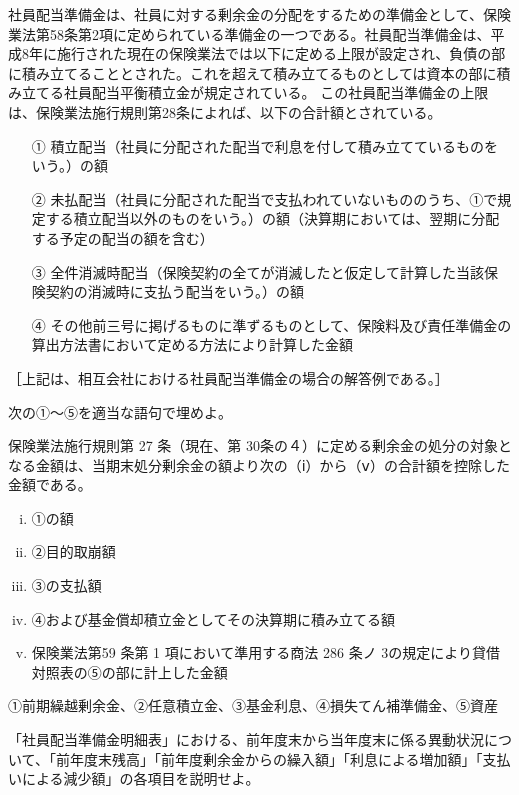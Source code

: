 \documentclass[report,gutter=10mm,fore-edge=10mm,uplatex,dvipdfmx]{jlreq}
\begin{document}

社員配当準備金は、社員に対する剰余金の分配をするための準備金として、保険業法第58条第2項に定められている準備金の一つである。社員配当準備金は、平成8年に施行された現在の保険業法では以下に定める上限が設定され、負債の部に積み立てることとされた。これを超えて積み立てるものとしては資本の部に積み立てる社員配当平衡積立金が規定されている。
この社員配当準備金の上限は、保険業法施行規則第28条によれば、以下の合計額とされている。
\begin{enumerate}
\item [①] 積立配当（社員に分配された配当で利息を付して積み立てているものをいう。）の額
\item [②] 未払配当（社員に分配された配当で支払われていないもののうち、①で規定する積立配当以外のものをいう。）の額（決算期においては、翌期に分配する予定の配当の額を含む）
\item [③] 全件消滅時配当（保険契約の全てが消滅したと仮定して計算した当該保険契約の消滅時に支払う配当をいう。）の額
\item [④] その他前三号に掲げるものに準ずるものとして、保険料及び責任準備金の算出方法書において定める方法により計算した金額
\end{enumerate}

［上記は、相互会社における社員配当準備金の場合の解答例である。］


次の①～⑤を適当な語句で埋めよ。 

保険業法施行規則第 27 条（現在、第 30条の４）に定める剰余金の処分の対象となる金額は、当期末処分剰余金の額より次の（ⅰ）から（ⅴ）の合計額を控除した金額である。

\begin{enumerate} [(i) ]
\item ①の額 
\item ②目的取崩額 
\item ③の支払額
\item ④および基金償却積立金としてその決算期に積み立てる額 
\item 保険業法第59 条第 1 項において準用する商法 286 条ノ 3の規定により貸借対照表の⑤の部に計上した金額
\end{enumerate}


①前期繰越剰余金、②任意積立金、③基金利息、④損失てん補準備金、⑤資産


「社員配当準備金明細表」における、前年度末から当年度末に係る異動状況について、「前年度末残高」「前年度剰余金からの繰入額」「利息による増加額」「支払いによる減少額」の各項目を説明せよ。
\end{document}
